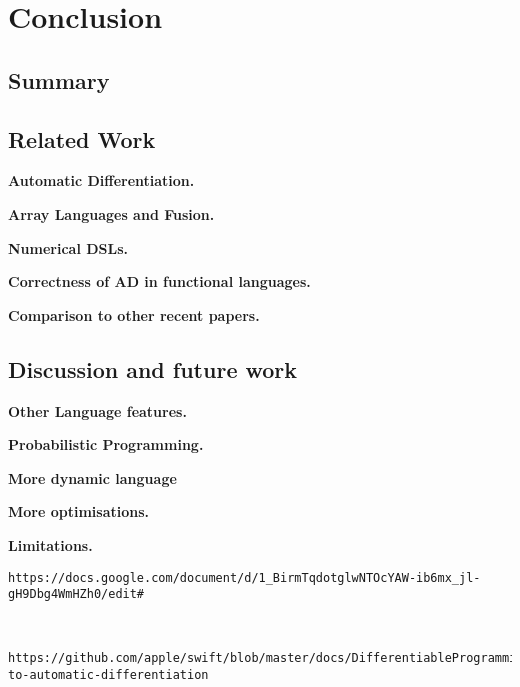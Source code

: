 \section{Conclusion}

\subsection{Summary} %
\label{sub:summary}

\subsection{Related Work} %
\label{sub:related_work}

\noindent \textbf{Automatic Differentiation.} 

\noindent \textbf{Array Languages and Fusion.}

\noindent \textbf{Numerical DSLs.} 

\noindent \textbf{Correctness of AD in functional languages.}

\noindent \textbf{Comparison to other recent papers.}

\subsection{Discussion and future work} %
\label{sub:discussion_and_future_work}

\noindent \textbf{Other Language features.}

\noindent \textbf{Probabilistic Programming.}

\noindent \textbf{More dynamic language}

\noindent \textbf{More optimisations.}

\noindent \textbf{Limitations.}


\begin{verbatim}https://docs.google.com/document/d/1_BirmTqdotglwNTOcYAW-ib6mx_jl-gH9Dbg4WmHZh0/edit# \end{verbatim}
\begin{verbatim}

	https://github.com/apple/swift/blob/master/docs/DifferentiableProgramming.md#approaches-to-automatic-differentiation
\end{verbatim}

